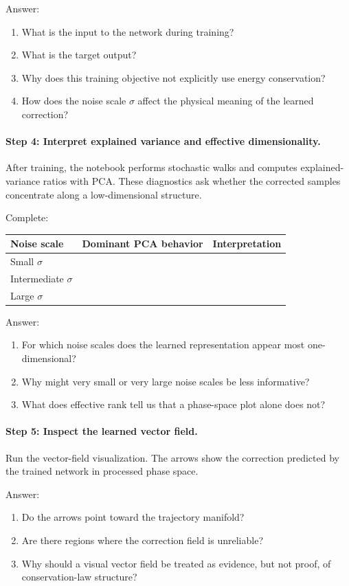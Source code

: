 Answer:
\begin{enumerate}
    \item What is the input to the network during training?
    \item What is the target output?
    \item Why does this training objective not explicitly use energy conservation?
    \item How does the noise scale \(\sigma\) affect the physical meaning of the learned correction?
\end{enumerate}

\paragraph{Step 4: Interpret explained variance and effective dimensionality.}
After training, the notebook performs stochastic walks and computes explained-variance ratios with PCA. These diagnostics ask whether the corrected samples concentrate along a low-dimensional structure.

Complete:
\begin{center}
\begin{tabular}{l l l}
\hline
Noise scale & Dominant PCA behavior & Interpretation \\
\hline
Small \(\sigma\) & & \\
Intermediate \(\sigma\) & & \\
Large \(\sigma\) & & \\
\hline
\end{tabular}
\end{center}

Answer:
\begin{enumerate}
    \item For which noise scales does the learned representation appear most one-dimensional?
    \item Why might very small or very large noise scales be less informative?
    \item What does effective rank tell us that a phase-space plot alone does not?
\end{enumerate}

\paragraph{Step 5: Inspect the learned vector field.}
Run the vector-field visualization. The arrows show the correction predicted by the trained network in processed phase space.

Answer:
\begin{enumerate}
    \item Do the arrows point toward the trajectory manifold?
    \item Are there regions where the correction field is unreliable?
    \item Why should a visual vector field be treated as evidence, but not proof, of conservation-law structure?
\end{enumerate}

